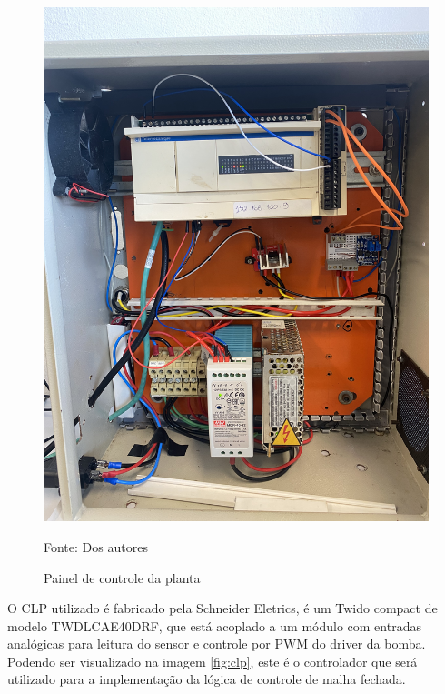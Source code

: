\begin{figure}[H]
    \centering\footnotesize
    \caption{Painel de controle da planta}
    \begin{center}
        \includegraphics[scale=0.1]{imagens/painel.jpg}
    \end{center}
    \label{fig:painel}
    \par Fonte: Dos autores
\end{figure}
    
O CLP utilizado é fabricado pela Schneider Eletrics, é um Twido compact de modelo TWDLCAE40DRF, que está acoplado a um módulo com entradas analógicas para leitura do sensor e controle por PWM do driver da bomba. Podendo ser visualizado na imagem \ref{fig:clp}, este é o controlador que será utilizado para a implementação da lógica de controle de malha fechada.

